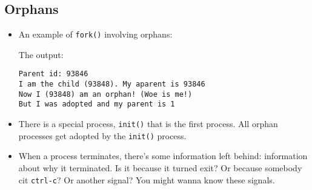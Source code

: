 \documentclass[]{article}
\newenvironment{Shaded}{}{}
\newcommand{\DecValTok}[1]{\textcolor[rgb]{0.25,0.63,0.44}{#1}}
\newcommand{\SpecialCharTok}[1]{\textcolor[rgb]{0.25,0.44,0.63}{#1}}
\newcommand{\StringTok}[1]{\textcolor[rgb]{0.25,0.44,0.63}{#1}}
\newcommand{\CommentTok}[1]{\textcolor[rgb]{0.38,0.63,0.69}{\textit{#1}}}
\newcommand{\ControlFlowTok}[1]{\textcolor[rgb]{0.00,0.44,0.13}{\textbf{#1}}}
\newcommand{\NormalTok}[1]{#1}
\begin{document}
\subsection{\texorpdfstring{\textbf{Orphans
}}{Orphans }}\label{header-n232}

\begin{itemize}
\item
  An example of \texttt{fork()} involving orphans:

\begin{Shaded}
\end{Shaded}

  The output:

\begin{verbatim}
Parent id: 93846
I am the child (93848). My aparent is 93846
Now I (93848) am an orphan! (Woe is me!)
But I was adopted and my parent is 1
\end{verbatim}
\item
  There is a special process, \texttt{init()} that is the first process.
  All orphan processes get adopted by the \texttt{init()} process.
\item
  When a process terminates, there's some information left behind:
  information about why it terminated. Is it because it turned exit? Or
  because somebody cit \texttt{ctrl-c}? Or another signal? You might
  wanna know these signals. 
\end{itemize}
\end{document}

